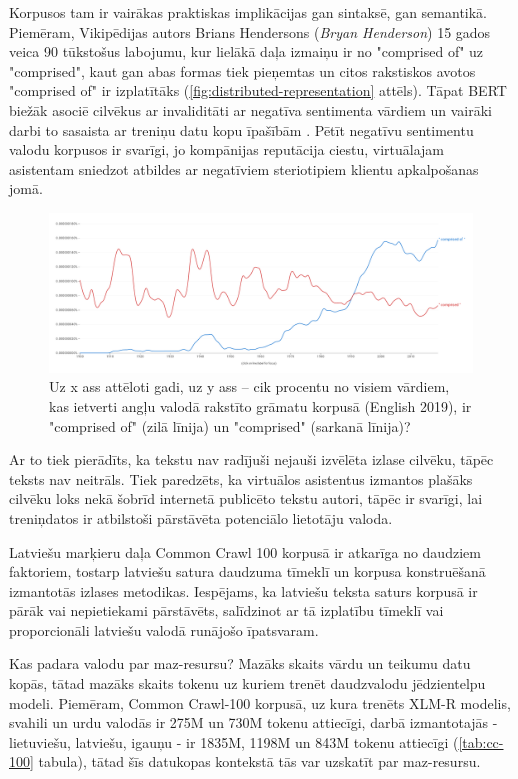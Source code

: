 Korpusos tam ir vairākas praktiskas implikācijas gan sintaksē, gan semantikā. Piemēram, Vikipēdijas autors Brians Hendersons (\textit{Bryan Henderson}) 15 gados veica 90 tūkstošus labojumu, kur lielākā daļa izmaiņu ir no "comprised of" uz "comprised", kaut gan abas formas tiek pieņemtas un citos rakstiskos avotos "comprised of" ir izplatītāks (\ref{fig:distributed-representation} attēls). Tāpat BERT biežāk asociē cilvēkus ar invaliditāti ar negatīva sentimenta vārdiem un vairāki darbi to sasaista ar treniņu datu kopu īpašībām \cite{bender2021}. Pētīt negatīvu sentimentu valodu korpusos ir svarīgi, jo kompānijas reputācija ciestu, virtuālajam asistentam sniedzot atbildes ar negatīviem steriotipiem klientu apkalpošanas jomā.


\begin{figure}[h]
    \centering
    \includegraphics[width=\textwidth]{figures/comprised.png}
    \caption{Uz x ass attēloti gadi, uz y ass -- cik procentu no visiem vārdiem, kas ietverti angļu valodā rakstīto grāmatu korpusā (English 2019), ir "comprised of" (zilā līnija) un "comprised" (sarkanā līnija)? \cite{ngram-viewer}}
    \label{fig:comprised}
\end{figure}

Ar to tiek pierādīts, ka tekstu nav radījuši nejauši izvēlēta izlase cilvēku, tāpēc teksts nav neitrāls. Tiek paredzēts, ka virtuālos asistentus izmantos plašāks cilvēku loks nekā šobrīd internetā publicēto tekstu autori, tāpēc ir svarīgi, lai treniņdatos ir atbilstoši pārstāvēta potenciālo lietotāju valoda.


Latviešu marķieru daļa Common Crawl 100 korpusā ir atkarīga no daudziem faktoriem, tostarp latviešu satura daudzuma tīmeklī un korpusa konstruēšanā izmantotās izlases metodikas. Iespējams, ka latviešu teksta saturs korpusā ir pārāk vai nepietiekami pārstāvēts, salīdzinot ar tā izplatību tīmeklī vai proporcionāli latviešu valodā runājošo īpatsvaram.


Kas padara valodu par maz-resursu? Mazāks skaits vārdu un teikumu datu kopās, tātad mazāks skaits tokenu uz kuriem trenēt daudzvalodu jēdzientelpu modeli. Piemēram, Common Crawl-100 korpusā, uz kura trenēts XLM-R modelis, svahili un urdu valodās ir 275M un 730M tokenu attiecīgi, darbā izmantotajās - lietuviešu, latviešu, igauņu - ir 1835M, 1198M un 843M tokenu attiecīgi (\ref{tab:cc-100} tabula), tātad šīs datukopas kontekstā tās var uzskatīt par maz-resursu.



